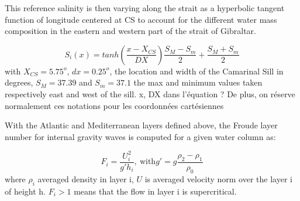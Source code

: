 This reference salinity is \color{blue} then varying \color{black} along the strait as a hyperbolic tangent function of longitude centered at CS to account for the different water mass composition in the eastern and western part of the strait of Gibraltar. 

\begin{equation}
	S_i(x)=tanh(\frac{x-X_{CS}}{DX})\frac{S_M-S_m}{2}+\frac{S_M+S_m}{2}
\end{equation}
with $X_{CS}=5.75^o$, $dx=0.25^o$, the location and width of the Camarinal Sill in degrees, $S_M=37.39$ and $S_m=37.1$ the max and minimum values taken respectively east and west of the sill.
\color{green}x, DX dans l'équation ? De plus, on réserve normalement ces notations pour les coordonnées cartésiennes \color{black}



With the Atlantic and Mediterranean layers defined above, the Froude layer number for internal gravity waves is computed for \color{blue} a given water column as\color{black}: 

\begin{equation}
F_i=\frac{U_i^2}{g'h_i} , \ \text{with} g'=g \frac{\rho_2-\rho_1}{\rho_0}
\end{equation}
where $\rho_i$ averaged density in layer i,  $U$ is averaged velocity norm over the layer i of height h. $F_i>1$ means that the flow in layer i is supercritical.


